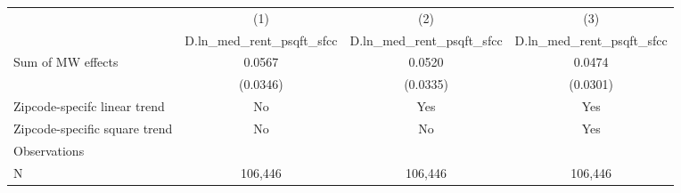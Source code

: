 {
\def\sym#1{\ifmmode^{#1}\else\(^{#1}\)\fi}
\begin{tabular}{l*{3}{c}}
\hline\hline
          &\multicolumn{1}{c}{(1)}&\multicolumn{1}{c}{(2)}&\multicolumn{1}{c}{(3)}\\
          &\multicolumn{1}{c}{D.ln\_med\_rent\_psqft\_sfcc}&\multicolumn{1}{c}{D.ln\_med\_rent\_psqft\_sfcc}&\multicolumn{1}{c}{D.ln\_med\_rent\_psqft\_sfcc}\\
\hline
Sum of MW effects&   0.0567         &   0.0520         &   0.0474         \\
          & (0.0346)         & (0.0335)         & (0.0301)         \\
\hline
Zipcode-specifc linear trend&       No         &      Yes         &      Yes         \\
Zipcode-specific square trend&       No         &       No         &      Yes         \\
Observations&                  &                  &                  \\
N         &  106,446         &  106,446         &  106,446         \\
\hline\hline
\end{tabular}
}
